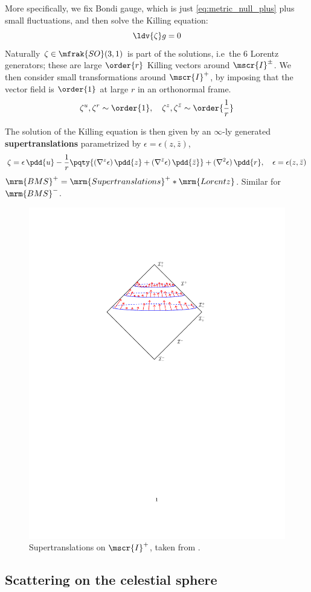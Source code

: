 \documentclass[a4paper
	,10pt
]{article}
\begin{document}
	More specifically, we fix Bondi gauge, which is just \eqref{eq:metric_null_plus} plus small fluctuations, and then solve the Killing equation:
	\begin{equation}
		\ldv{\zeta} g = 0
	\end{equation}
	Naturally $\zeta \in \mfrak{SO}(3,1)$ is part of the solutions, i.e~the 6 Lorentz generators; these are large $\order{r}$ Killing vectors around $\mscr{I}^\pm$. 
	We then consider small transformations around $\mscr{I}^+$, by imposing that the vector field is $\order{1}$ at large $r$ in an orthonormal frame. 
	\begin{equation}
		\zeta^u,\zeta^r
		\sim \order{1},
	\quad
		\zeta^z,\zeta^{\bar{z}}
		\sim \order{\frac{1}{r}}
	\end{equation}
	
	The solution of the Killing equation is then given by an $\infty$-ly generated \textbf{supertranslations} parametrized by $\epsilon = \epsilon(z,\bar{z})$,
	\begin{equation}
		\zeta
		= \epsilon\,\pdd{u}
		- \frac{1}{r} \pqty{
			(\nabla^z \epsilon)\,\pdd{z}
			+ (\nabla^{\bar{z}} \epsilon)\,\pdd{\bar{z}}
		} + (\nabla^2 \epsilon)\,\pdd{r},
	\quad
		\epsilon = \epsilon(z,\bar{z})
	\end{equation}
	$\mrm{BMS}^+ = \mrm{Supertranslations}^+ * \mrm{Lorentz}$. Similar for $\mrm{BMS}^-$. 
	
	\begin{figure}[!h]
	\centering
	\includegraphics[width=.45\linewidth]{img/supertranslation.pdf}
	\caption[Supertranslations on $\mscr{I}^+$]{
		Supertranslations on $\mscr{I}^+$, taken from \cite{Strominger:2017zoo}.
	}
	\end{figure}
	
\subsection{Scattering on the celestial sphere}
	
\end{document}
